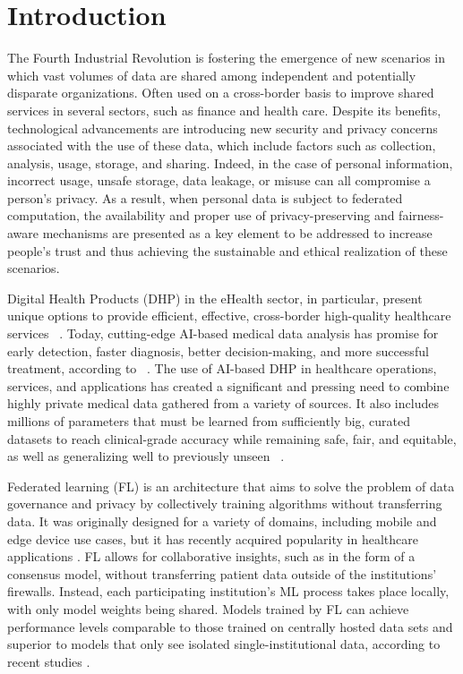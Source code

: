 \chapter{Introduction} \label{chap1}

The Fourth Industrial Revolution is fostering the emergence of new scenarios in which vast volumes of data are shared among independent and potentially disparate organizations. Often used on a cross-border basis to improve shared services in several sectors, such as finance and health care. Despite its benefits, technological advancements are introducing new security and privacy concerns associated with the use of these data, which include factors such as collection, analysis, usage, storage, and sharing. Indeed, in the case of personal information, incorrect usage, unsafe storage, data leakage, or misuse can all compromise a person's privacy. As a result, when personal data is subject to federated computation, the availability and proper use of privacy-preserving and fairness-aware mechanisms are presented as a key element to be addressed to increase people's trust and thus achieving the sustainable and ethical realization of these scenarios.

Digital Health Products (DHP) in the eHealth sector, in particular, present unique options to provide efficient, effective, cross-border high-quality healthcare services ~\cite{world2017global}. Today, cutting-edge AI-based medical data analysis has promise for early detection, faster diagnosis, better decision-making, and more successful treatment, according to ~\cite{arnold2017doctor}. The use of AI-based DHP in healthcare operations, services, and applications has created a significant and pressing need to combine highly private medical data gathered from a variety of sources. It also includes millions of parameters that must be learned from sufficiently big, curated datasets to reach clinical-grade accuracy while remaining safe, fair, and equitable, as well as generalizing well to previously unseen ~\cite{wang2019deep}.

Federated learning (FL) is an architecture that aims to solve the problem of data governance and privacy by collectively training algorithms without transferring data. It was originally designed for a variety of domains, including mobile and edge device use cases, but it has recently acquired popularity in healthcare applications \cite{intro}. FL allows for collaborative insights, such as in the form of a consensus model, without transferring patient data outside of the institutions' firewalls. Instead, each participating institution's ML process takes place locally, with only model weights being shared. Models trained by FL can achieve performance levels comparable to those trained on centrally hosted data sets and superior to models that only see isolated single-institutional data, according to recent studies \cite{intro}.

